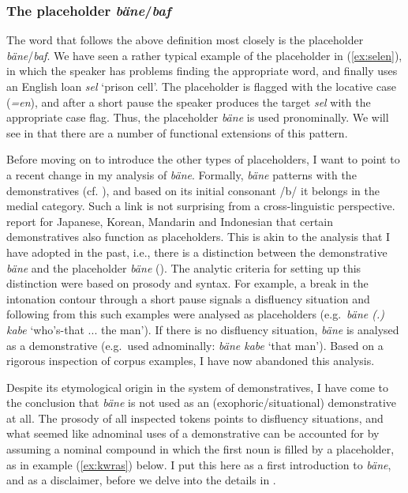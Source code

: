 \documentclass[output=paper,colorlinks,citecolor=brown]{langscibook}
\begin{document}
\subsubsection{The placeholder \textit{bäne}/\textit{baf}}\label{sec:doehler:baneintro}

The word that follows the above definition most closely is the placeholder \textit{bäne}/\textit{baf}. We have seen a rather typical example of the placeholder in (\ref{ex:selen}), in which the speaker has problems finding the appropriate word, and finally uses an English loan \textit{sel} `prison cell'. The placeholder is flagged with the locative case (\textit{=en}), and after a short pause the speaker produces the target \textit{sel} with the appropriate case flag. Thus, the placeholder \textit{bäne} is used pronominally. We will see in  that there are a number of functional extensions of this pattern.

Before moving on to introduce the other types of placeholders, I want to point to a recent change in my analysis of \textit{bäne}. Formally, \textit{bäne} patterns with the demonstratives (cf. ), and based on its initial consonant /b/ it belongs in the medial category. Such a link is not surprising from a cross-linguistic perspective. \textcite{Hayashi:2006aa} report for Japanese, Korean, Mandarin and Indonesian that certain demonstratives also function as placeholders. This is akin to the analysis that I have adopted in the past, i.e., there is a distinction between the demonstrative \textit{bäne} and the placeholder \textit{bäne} (\cite[112]{Dohler:2018qt}). The analytic criteria for setting up this distinction were based on prosody and syntax. For example, a break in the intonation contour through a short pause signals a disfluency situation and following from this such examples were analysed as placeholders (e.g.\ \textit{bäne (.) kabe} `who's-that ... the man'). If there is no disfluency situation, \textit{bäne} is analysed as a demonstrative (e.g.\ used adnominally: \textit{bäne kabe} `that man'). Based on a rigorous inspection of corpus examples, I have now abandoned this analysis.

Despite its etymological origin in the system of demonstratives, I have come to the conclusion that \textit{bäne} is not used as an (exophoric/situational) demonstrative at all. The prosody of all inspected tokens points to disfluency situations, and what seemed like adnominal uses of a demonstrative can be accounted for by assuming a nominal compound in which the first noun is filled by a placeholder, as in example (\ref{ex:kwras}) below. I put this here as a first introduction to \textit{bäne}, and as a disclaimer, before we delve into the details in .
\end{document}
